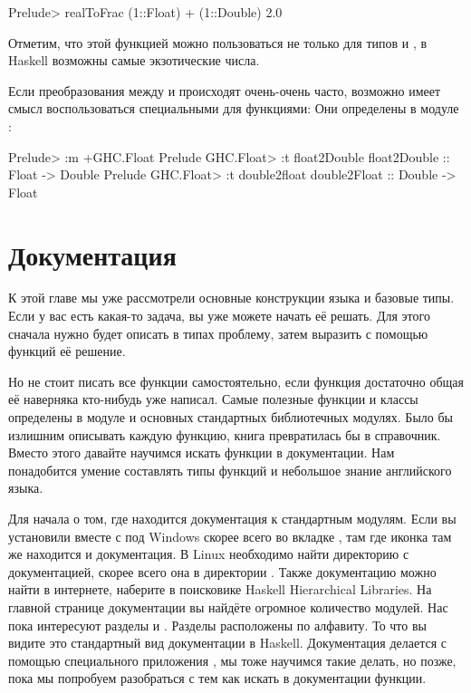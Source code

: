 \begin{code}
Prelude> realToFrac (1::Float) + (1::Double)
2.0
\end{code}

Отметим, что этой функцией можно пользоваться не только для типов
 и , в Haskell возможны самые экзотические числа.

Если преобразования между  и  происходят
очень-очень часто, возможно имеет смысл воспользоваться специальными для
 функциями: Они определены в модуле :


\begin{code}
Prelude> :m +GHC.Float
Prelude GHC.Float> :t float2Double
float2Double :: Float -> Double
Prelude GHC.Float> :t double2float
double2Float :: Double -> Float
\end{code}

\section{Документация}

К этой главе мы уже рассмотрели основные конструкции языка и базовые
типы. Если у вас есть какая-то задача, вы уже можете начать её решать.
Для этого сначала нужно будет описать в типах проблему, затем выразить с
помощью функций её решение.

Но не стоит писать все функции самостоятельно, если функция достаточно
общая её наверняка кто-нибудь уже написал. Самые полезные функции и
классы определены в модуле  и основных стандартных
библиотечных модулях. Было бы излишним описывать каждую функцию, книга
превратилась бы в справочник. Вместо этого давайте научимся искать
функции в документации. Нам понадобится умение составлять типы функций и
небольшое знание английского языка.

Для начала о том, где находится документация к стандартным модулям. Если
вы установили  вместе с  под Windows скорее
всего во вкладке , там где иконка  там же находится и
документация. В Linux необходимо найти директорию с документацией,
скорее всего она в директории .
Также документацию можно найти в интернете, наберите в поисковике
Haskell Hierarchical Libraries. На главной странице документации вы
найдёте огромное количество модулей. Нас пока интересуют разделы
 и . Разделы расположены по алфавиту. То что вы
видите это стандартный вид документации в Haskell. Документация делается
с помощью специального приложения , мы тоже научимся такие
делать, но позже, пока мы попробуем разобраться с тем как искать в
документации функции.

